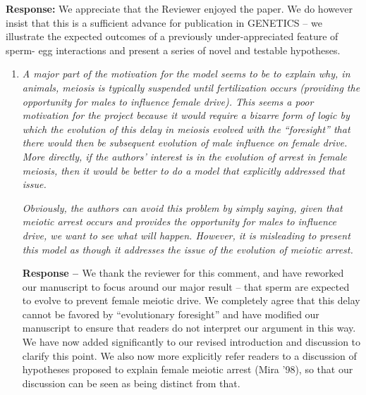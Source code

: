 \documentclass[12pt,letterpaper]{article}
\newcommand{\gc}[1]{{ \color{red} #1}}
\begin{document}
{\bf{Response:}} \gc{We appreciate that the Reviewer enjoyed the paper.}
We do however insist that this is a sufficient advance for publication in GENETICS --
 we illustrate the expected outcomes of a previously under-appreciated feature of sperm-
 egg interactions and present a series of novel and testable hypotheses. 
\begin{enumerate}
\item
\begin{singlespace}
\emph{A major part of the motivation for the model seems to be to explain why, in
animals, meiosis is typically suspended until fertilization occurs (providing
the opportunity for males to influence female drive).  This seems a poor
motivation for the project because it would require a bizarre form of logic by
which the evolution of this delay in meiosis evolved with the ``foresight'' that
there would then be subsequent evolution of male influence on female drive. 
More directly, if the authors' interest is in the evolution of arrest in female
meiosis, then it would be better to do a model that explicitly addressed that
issue.  }

\emph{Obviously, the authors can avoid this problem by simply saying, given that
meiotic arrest occurs and provides the opportunity for males to influence drive,
we want to see what will happen.  However, it is misleading to present this
model as though it addresses the issue of the evolution of meiotic arrest.}
\end{singlespace}

\begin{singlespace}
{\bf{Response -- }} We thank the reviewer for this comment, and have reworked our manuscript to focus 
	around our major result -- that sperm are expected to evolve to prevent female meiotic drive. 
	We completely agree that this delay \gc{cannot} be favored by ``evolutionary foresight'' and have 
	modified our manuscript to ensure that readers do not
        interpret our argument in this way. \gc{We have now added
          significantly to our  revised introduction and discussion to
          clarify this point. 	
We also now more explicitly refer readers to a discussion of
        hypotheses proposed to explain female meiotic arrest (Mira
        '98), so that our discussion can be seen as being distinct
        from that. }


%	
\end{singlespace}


\end{enumerate}
\end{document}

